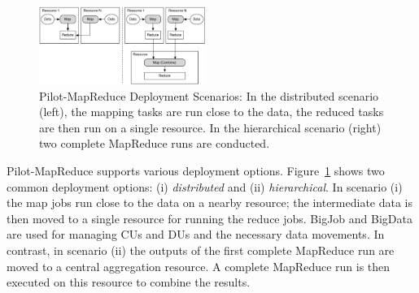 \documentclass{acm_proc_article-sp}
\newcommand{\pilotmapreduce}{Pilot-MapReduce\xspace}
\begin{document}
\begin{figure}
	\centering
	\includegraphics[width=0.48\textwidth]{figures/distributed_hierachical.pdf}
	\caption{\pilotmapreduce Deployment 
	Scenarios: In the distributed scenario (left), the mapping tasks are run close to the data, the reduced tasks are then run on a single resource. In the hierarchical scenario (right) two complete MapReduce runs are conducted. \label{fid:distributed-mapreduce-overview}}
\end{figure}


\pilotmapreduce supports various deployment options.
Figure~\ref{fid:distributed-mapreduce-overview} shows two common deployment
options: (i) \emph{distributed} and (ii) \emph{hierarchical}. In scenario (i)
the map jobs run close to the data on a nearby resource; the intermediate data
is then moved to a single resource for running the reduce jobs. BigJob and
BigData are used for managing CUs and DUs and the necessary data movements. In
contrast, in scenario (ii) the outputs of the first complete MapReduce run are
moved to a central aggregation resource. A complete MapReduce run is then
executed on this resource to combine the results.


\end{document}

